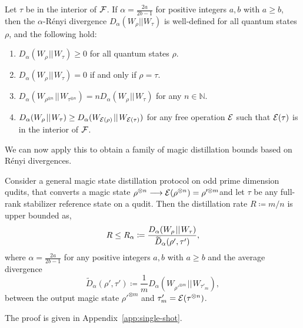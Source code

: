 \documentclass[pra,
aps,
twocolumn,
superscriptaddress,
groupedaddress,
nofootinbib,
reprint
]{revtex4-1}
\begin{document}
\begin{theorem}\label{thm:Da_props} 
	Let $\tau$ be in the interior of ${\mathcal F}$. 
	If $\alpha = \frac{2a}{2b-1}$ for positive integers $a,b$ with $a \geq b$, then the $\alpha$-R\'{e}nyi divergence $D_\alpha(W_\rho || W_\tau)$ is well-defined for all quantum states $\rho$, and the following hold:
\begin{enumerate}
\item $D_\alpha(W_\rho \hspace{1pt}||\hspace{1pt} W_\tau) \ge 0$ for all quantum states $\rho$.
\item  $D_\alpha(W_\rho \hspace{1pt}||\hspace{1pt} W_\tau) = 0$ if and only if $\rho =\tau$.
\item $D_\alpha(W_{\rho^{\otimes n}} \hspace{1pt}||\hspace{1pt} W_{\tau^{\otimes n}}) = n D_\alpha(W_\rho \hspace{1pt}||\hspace{1pt} W_\tau)$ for any $n \in \mathbb{N}$.
\item $D_\alpha(W_\rho \hspace{1pt}||\hspace{1pt} W_\tau) \geq D_\alpha (W_{{\mathcal E}(\rho)} \hspace{1pt}||\hspace{1pt} W_{{\mathcal E}(\tau)})$ for any free operation ${\mathcal E}$ such that ${\mathcal E}(\tau)$ is in the interior of ${\mathcal F}$.
\end{enumerate}
\end{theorem}

We can now apply this to obtain a family of magic distillation bounds based on R\'{e}nyi divergences.
\begin{theorem}\label{thm:entropic_bounds}
	Consider a general magic state distillation protocol on odd prime dimension qudits, that converts a magic state $\rho^{\otimes n} \longrightarrow {\mathcal E}(\rho^{\otimes n})=\rho'^{\otimes m}$and let $\tau$ be any full-rank stabilizer reference state on a qudit. Then the distillation rate $R \coloneqq m/n$ is upper bounded as,
	\begin{equation}
		R \leq R_\alpha \coloneqq \frac{D_{\alpha}(W_\rho \hspace{1pt}||\hspace{1pt} W_\tau)}{\rlap{\raisebox{-0.2ex}{$\widetilde{\phantom{D}}$}}D_\alpha( \rho', \tau')},
	\end{equation}
	where $\alpha = \frac{2a}{2b-1}$ for any positive integers $a,b$ with $a \geq b$ and the average divergence
	\begin{equation}
\widetilde{D}_\alpha( \rho', \tau') \coloneqq \frac{1}{m} D_\alpha (W_{\rho'^{\otimes m}} \hspace{1pt}||\hspace{1pt} W_{\tau'_m}),
\end{equation}
between the output magic state $\rho'^{\otimes m}$ and $\tau'_m = {\mathcal E}(\tau^{\otimes n})$.
\end{theorem}
The proof is given in Appendix~\ref{app:single-shot}. 
\end{document}
